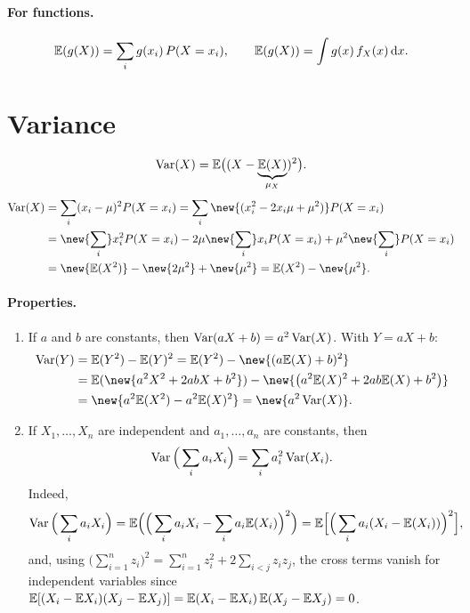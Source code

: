 \paragraph{For functions.}
\[
\mathbb{E}(g(X)) = \sum_i g(x_i)\,P(X = x_i), \qquad \mathbb{E}(g(X)) = \int g(x)\,f_X(x)\,\mathrm{d} x.
\]

\section{Variance}
\[
\operatorname{Var}(X) = \mathbb{E}\big((X - \underbrace{\mathbb{E}(X)}_{\mu_X})^2\big).
\]
\begin{align*}
\Var(X) &= \sum_i (x_i - \mu)^2 P(X = x_i) = \sum_i \new{(x_i^2 - 2x_i\mu + \mu^2)}P(X = x_i)\\
&= \new{\sum_i} x_i^2 P(X = x_i) - 2\mu\new{\sum_i} x_i P(X = x_i) + \mu^2\new{\sum_i} P(X = x_i)\\
&= \new{\E(X^2)} - \new{2\mu^2} + \new{\mu^2} = \E(X^2) - \new{\mu^2}.
\end{align*}

\paragraph{Properties.}
\begin{enumerate}[label=(\roman*)]
\item If $a$ and $b$ are constants, then $\operatorname{Var}(aX + b) = a^2\operatorname{Var}(X)$. With $Y = aX + b$:
\begin{align*}
\Var(Y) &= \E(Y^2) - \E(Y)^2 = \E(Y^2) - \new{(a\E(X) + b)^2}\\
&= \E(\new{a^2X^2 + 2abX + b^2}) - \new{\big(a^2\E(X)^2 + 2ab\E(X) + b^2\big)}\\
&= \new{a^2\E(X^2) - a^2\E(X)^2} = \new{a^2\Var(X)}.
\end{align*}
\item If $X_1, \dots, X_n$ are independent and $a_1, \dots, a_n$ are constants, then
\[
\operatorname{Var}\Big(\sum_i a_i X_i\Big) = \sum_i a_i^2\operatorname{Var}(X_i).
\]
Indeed,
\[
\operatorname{Var}\Big(\sum_i a_i X_i\Big) = \mathbb{E}\Big(\Big(\sum_i a_i X_i - \sum_i a_i\mathbb{E}(X_i)\Big)^2\Big) = \mathbb{E}\Big[\Big(\sum_i a_i(X_i - \mathbb{E}(X_i))\Big)^2\Big],
\]
and, using $\big(\sum_{i=1}^{n} z_i\big)^2 = \sum_{i=1}^{n} z_i^2 + 2\sum_{i<j} z_i z_j$, the cross terms vanish for independent variables since $\mathbb{E}[(X_i - \mathbb{E} X_i)(X_j - \mathbb{E} X_j)] = \mathbb{E}(X_i - \mathbb{E} X_i)\,\mathbb{E}(X_j - \mathbb{E} X_j) = 0$.
\end{enumerate}


